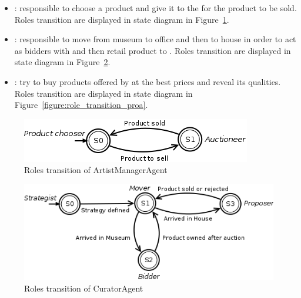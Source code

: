 \documentclass[a4paper,11pt]{report}
\begin{document}
  \begin{itemize}
   \itemsep0pt
   \item \ama{}: responsible to choose a product and give it to the \cua{} for the product to 
   be sold. Roles transition are displayed in state diagram in Figure~\ref{figure:role_transition_ama}.
   \item \cua{}: responsible to move from museum to office and then to house in order to 
   act as bidders with \ama{} and then retail product to \proa{}. Roles transition are displayed in 
   state diagram in Figure~\ref{figure:role_transition_cua}.
   \item \proa{}: try to buy products offered by \cua{} at the best prices and reveal its qualities. 
   Roles transition are displayed in state diagram in Figure~\ref{figure:role_transition_proa}.
  \end{itemize}
  

  
  \begin{figure}[ht!]
    \centering
    \includegraphics[width=\textwidth]{media/role_transition_ama.png}
    \caption{Roles transition of ArtistManagerAgent}
    \label{figure:role_transition_ama}
  \end{figure}
  
  \begin{figure}[ht!]
    \centering
    \includegraphics[width=\textwidth]{media/role_transition_cua.png}
    \caption{Roles transition of CuratorAgent}
    \label{figure:role_transition_cua}
  \end{figure}
  
\end{document}

